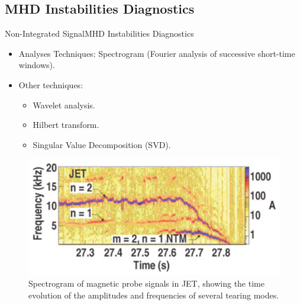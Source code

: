 \documentclass{beamer}
\begin{document}
\subsection{MHD Instabilities Diagnostics}
\begin{frame}{Non-Integrated Signal}{MHD Instabilities Diagnostics}
	\begin{itemize}
		\item Analyses Techniques: Spectrogram (Fourier analysis of successive short-time windows).
		\item Other techniques:
		\begin{itemize}
			\item Wavelet  analysis.
			\item Hilbert transform.
			\item Singular Value Decomposition (SVD).
		\end{itemize}
	\end{itemize}
	\begin{figure}[ht]
		\begin{center}
			\includegraphics[width=0.6 \columnwidth]{SpectrogramJET.png}
			\caption{\small Spectrogram of magnetic probe signals in JET, showing the time evolution of the amplitudes and frequencies of several tearing modes.}
		\end{center}
	\end{figure}
\end{frame}
\end{document}

